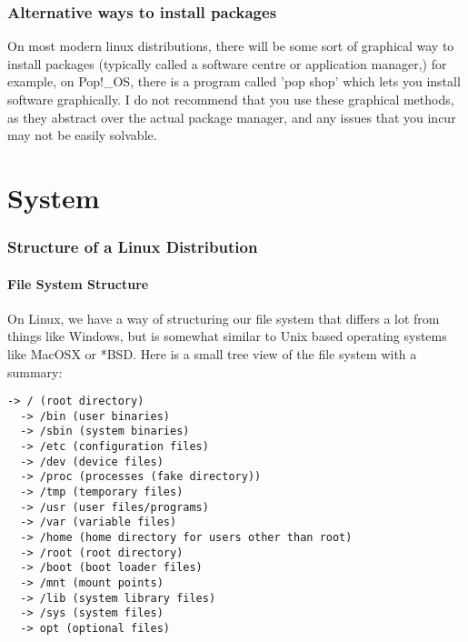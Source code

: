 \documentclass {report}
\begin{document}
\subsection{Alternative ways to install packages}

On most modern linux distributions, there will be some sort of graphical way to install packages (typically called a software centre or application manager,) for example, on Pop!\_OS, there is a program called 'pop shop' which lets you install software graphically. I do not recommend that you use these graphical methods, as they abstract over the actual package manager, and any issues that you incur may not be easily solvable.

\chapter{System}
\subsection{Structure of a Linux Distribution}
\subsubsection{File System Structure}
On Linux, we have a way of structuring our file system that differs a lot from things like Windows, but is somewhat similar to Unix based operating systems like MacOSX or *BSD. Here is a small tree view of the file system with a summary:

\begin{lstlisting}
-> / (root directory)
  -> /bin (user binaries)
  -> /sbin (system binaries)
  -> /etc (configuration files)
  -> /dev (device files)
  -> /proc (processes (fake directory))
  -> /tmp (temporary files)
  -> /usr (user files/programs)
  -> /var (variable files)
  -> /home (home directory for users other than root)
  -> /root (root directory)
  -> /boot (boot loader files)
  -> /mnt (mount points)
  -> /lib (system library files)
  -> /sys (system files)
  -> opt (optional files)
\end{lstlisting}
\end{document}
